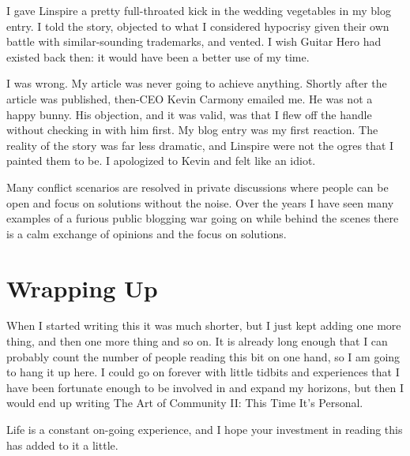 I gave Linspire a pretty full-throated kick in the wedding vegetables in my blog
entry. I told the story, objected to what I considered hypocrisy given their own
battle with similar-sounding trademarks, and vented. I wish Guitar Hero had
existed back then: it would have been a better use of my time.

I was wrong. My article was never going to achieve anything. Shortly after the
article was published, then-CEO Kevin Carmony emailed me. He was not a happy
bunny. His objection, and it was valid, was that I flew off the handle without
checking in with him first. My blog entry was my first reaction. The reality of
the story was far less dramatic, and Linspire were not the ogres that I painted
them to be. I apologized to Kevin and felt like an idiot.

Many conflict scenarios are resolved in private discussions where people can be
open and focus on solutions without the noise. Over the years I have seen many
examples of a furious public blogging war going on while behind the scenes there
is a calm exchange of opinions and the focus on solutions.

\section*{Wrapping Up}

When I started writing this it was much shorter, but I just kept adding one more
thing, and then one more thing and so on. It is already long enough that I can
probably count the number of people reading this bit on one hand, so I am going
to hang it up here. I could go on forever with little tidbits and experiences
that I have been fortunate enough to be involved in and expand my horizons, but
then I would end up writing The Art of Community II: This Time It's Personal.

Life is a constant on-going experience, and I hope your investment in reading
this has added to it a little.
